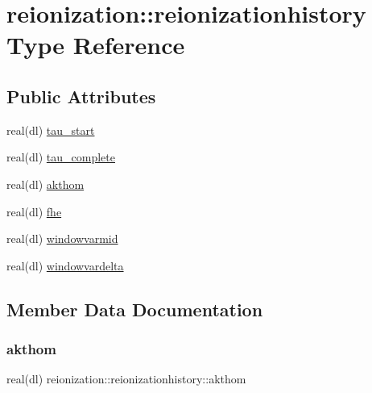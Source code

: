 \hypertarget{structreionization_1_1reionizationhistory}{}\section{reionization\+:\+:reionizationhistory Type Reference}
\label{structreionization_1_1reionizationhistory}
\subsection*{Public Attributes}
\begin{DoxyCompactItemize}
\item 
real(dl) \mbox{\hyperlink{structreionization_1_1reionizationhistory_a5d55cb8b77c93d5a8a34b762b9fc0951}{tau\+\_\+start}}
\item 
real(dl) \mbox{\hyperlink{structreionization_1_1reionizationhistory_a8d8e37775dbd97ebe98f65420ffde4e0}{tau\+\_\+complete}}
\item 
real(dl) \mbox{\hyperlink{structreionization_1_1reionizationhistory_adcff74c8d0e4e2a5a9c206fde5e56039}{akthom}}
\item 
real(dl) \mbox{\hyperlink{structreionization_1_1reionizationhistory_adb9677b6cb37b28e79ca38278401385f}{fhe}}
\item 
real(dl) \mbox{\hyperlink{structreionization_1_1reionizationhistory_a8aa8eac099f46d74aeac1c76597d571d}{windowvarmid}}
\item 
real(dl) \mbox{\hyperlink{structreionization_1_1reionizationhistory_a08308af85c4117bf244e52469c6bc76f}{windowvardelta}}
\end{DoxyCompactItemize}


\subsection{Member Data Documentation}
\mbox{\label{structreionization_1_1reionizationhistory_adcff74c8d0e4e2a5a9c206fde5e56039}} 
\subsubsection{\texorpdfstring{akthom}{akthom}}
{\footnotesize\ttfamily real(dl) reionization\+::reionizationhistory\+::akthom}

